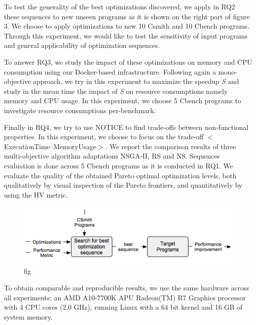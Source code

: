 To test the generality of the best optimizations discovered, we apply in RQ2 these sequences to new unseen programs as it is shown on the right part of figure 3. We choose to apply optimizations to new 10 Csmith and 10 Cbench programs. Through this experiment, we would like to test the sensitivity of input programs and general applicability of optimization sequences.

To answer RQ3, we study the impact of these optimizations on memory and CPU consumption using our Docker-based infrastructure. Following again a mono-objective approach, we try in this experiment to maximize the speedup \textit{S} and study in the mean time the impact of \textit{S} on resource consumptions namely memory and CPU usage. In this experiment, we choose 5 Cbench programs to investigate resource consumptions per-benchmark.

Finally in RQ4, we try to use NOTICE to find trade-offs between non-functional properties. In this experiment, we choose to focus on the trade-off $<$ExecutionTime--MemoryUsage$>$. We report the comparison results of three multi-objective algorithm adaptations NSGA-II, RS and NS. 
Sequences evaluation is done across 5 Cbench programs as it is conducted in RQ1.
We evaluate the quality of the obtained Pareto optimal optimization levels, both qualitatively by visual inspection of the Pareto frontiers, and quantitatively by using the HV metric.
\begin{figure}[h]
	\centering
	\includegraphics[width=1.\linewidth]{Ressources/sensitivity.png}
	\caption{fig}
\end{figure}

To obtain comparable and reproducible results, we use the same hardware across all experiments: an AMD A10-7700K APU Radeon(TM) R7 Graphics processor with 4 CPU cores (2.0 GHz), running Linux with a 64 bit kernel and 16 GB of system memory.


